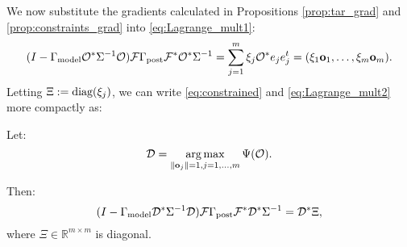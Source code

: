 We now substitute the gradients calculated in Propositions
\ref{prop:tar_grad} and \ref{prop:constraints_grad} into
\eqref{eq:Lagrange_mult1}:
\begin{equation}\label{eq:constrained}
  (I - \modcov \obs^* \Sigma^{-1} \obs) \fwd \postcov \fwd^* \obs^*\Sigma^{-1}
  = \sum_{j=1}^m \xi_j \obs^* e_je_j^t = (\xi_1 \meas_1,\dots,\xi_m \meas_m).
\end{equation} 
Letting $\Xi := \textup{diag}(\xi_j)$, we can write \eqref{eq:constrained} and
\eqref{eq:Lagrange_mult2} more compactly as:

\begin{theorem}\label{thm:constrained}
  Let:
  \begin{equation*}
    \opt = \argmax_{\|\meas_j\| = 1, j=1,\dots,m}\tar(\obs).
  \end{equation*}
  
  Then:
  \begin{equation*}
    ( I - \modcov \opt^* \Sigma^{-1} \opt) \fwd \postcov \fwd^* \opt^*  \Sigma^{-1}
    = \opt^* \Xi, 
  \end{equation*}
  where $\Xi \in \mathbb{R}^{m \times m}$ is diagonal.
\end{theorem}




